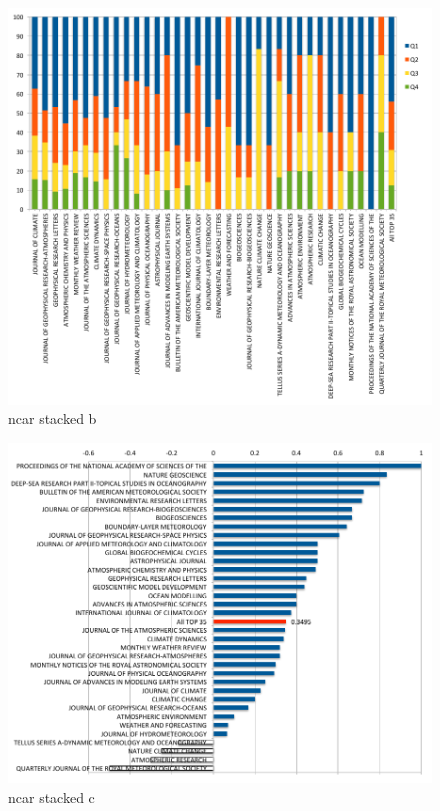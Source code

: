 \documentclass{sig-alternate}
\begin{document}
\begin{figure}[htb] 
  \centering 
    \includegraphics[width=1.0\columnwidth]{images-new/ncar-b.pdf} 
  \caption{ncar stacked b}\label{F:ncar-stacked-b} 
\end{figure} 

\begin{figure}[htb] 
  \centering 
    \includegraphics[width=1.0\columnwidth]{images-new/ncar-c.pdf} 
  \caption{ncar stacked c}\label{F:ncar-score}
\end{figure} 
\end{document}
